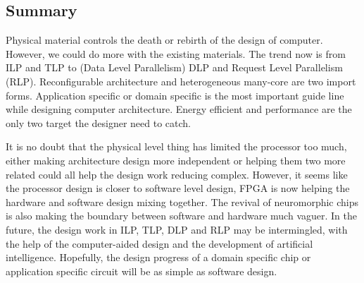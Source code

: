 \subsection{Summary}
\par Physical material controls the death or rebirth of the design of computer. However, we could do more with the existing materials. The trend now is from ILP and TLP to (Data Level Parallelism) DLP and Request Level Parallelism (RLP)\cite{hennessy2017computer}. Reconfigurable architecture and heterogeneous many-core are two import forms. Application specific or domain specific is the most important guide line while designing computer architecture. Energy efficient and performance are the only two target the designer need to catch.
\par It is no doubt that the physical level thing has limited the processor too much, either making architecture design more independent or helping them two more related could all help the design work reducing complex. However, it seems like the processor design is closer to software level design, FPGA is now helping the hardware and software design mixing together. The revival of neuromorphic chips is also making the boundary between software and hardware much vaguer. In the future, the design work in ILP, TLP, DLP and RLP may be intermingled, with the help of the computer-aided design and the development of artificial intelligence. Hopefully, the design progress of a domain specific chip or application specific circuit will be as simple as software design.

